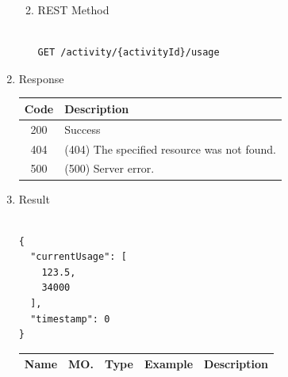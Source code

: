 \begin{enumerate}
\begin{enumerate}
\begin{table}[H]
\begin{center}
\begin{tabular}{|p{3cm}|l|p{3cm}|p{3cm}|p{4cm}|}

\end{tabular}
\end{center}
\end{table}


\item REST Method

\begin{tcolorbox}[boxrule=0pt, frame empty]
\begin{verbatim} 

GET /activity/{activityId}/usage

\end{verbatim}
\end{tcolorbox}

\end{enumerate}

\item Response

\begin{table}[H]
\footnotesize

\begin{center}
\begin{tabular}{|c|l|} 
\hline
\rowcolor{lightgray}	Code 		& 	Description \\
\hline
200	 		&	Success \\
\hline
404			&	(404) The specified resource was not found. \\
\hline
500			&	(500) Server error. \\
\hline
\end{tabular}
\end{center}
\end{table}

\item Result

\begin{tcolorbox}[boxrule=0pt, frame empty]
\begin{verbatim}

{
  "currentUsage": [
    123.5,
    34000
  ],
  "timestamp": 0
}

\end{verbatim}
\end{tcolorbox}

\begin{table}[H]
\footnotesize
\begin{center}
\begin{tabular}{|p{3cm}|l|p{3cm}|p{3cm}|p{4cm}|} 
\hline
\rowcolor{lightgray}	Name	& MO.	& Type	& Example & 	Description \\
\hline


\end{tabular}
\end{center}
\end{table}
\end{enumerate}
